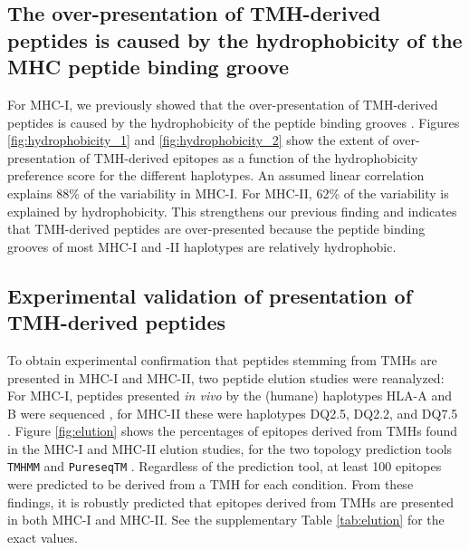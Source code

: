 \subsection{The over-presentation of TMH-derived peptides is caused by the hydrophobicity of the MHC peptide binding groove}

For MHC-I, we previously showed that the over-presentation of TMH-derived peptides is caused by the hydrophobicity of the peptide binding grooves \cite{bianchi2017}. Figures \ref{fig:hydrophobicity_1} and \ref{fig:hydrophobicity_2}
show the extent of over-presentation
of TMH-derived epitopes as a function of the hydrophobicity preference score for the different haplotypes.
An assumed linear correlation explains 88\% of the variability in MHC-I.
For MHC-II, 62\% of the variability is explained by hydrophobicity. This strengthens our previous finding \cite{bianchi2017} and indicates that TMH-derived peptides are over-presented because the peptide binding grooves of most MHC-I and -II haplotypes are relatively hydrophobic.

\subsection{Experimental validation of presentation of TMH-derived peptides}



To obtain experimental confirmation that peptides stemming from TMHs 
are presented in MHC-I and MHC-II,
two peptide elution studies were reanalyzed:
For MHC-I, peptides presented \emph{in vivo} 
by the (humane) haplotypes HLA-A and B 
were sequenced \cite{schellens2015comprehensive},
for MHC-II these were haplotypes DQ2.5, DQ2.2, and 
DQ7.5 \cite{bergseng2015different}.
Figure \ref{fig:elution} shows the percentages of epitopes derived 
from TMHs
found in the MHC-I and MHC-II elution 
studies,
for the two topology prediction tools \verb;TMHMM; \cite{krogh2001predicting} 
and \verb;PureseqTM; \cite{wang2019efficient}. 
Regardless of the prediction tool, 
at least 100 epitopes were predicted to be derived from a TMH for each condition. 
From these findings, it is robustly predicted that
epitopes derived from TMHs are presented in both MHC-I and MHC-II.
See the supplementary Table \ref{tab:elution} for the exact values.

